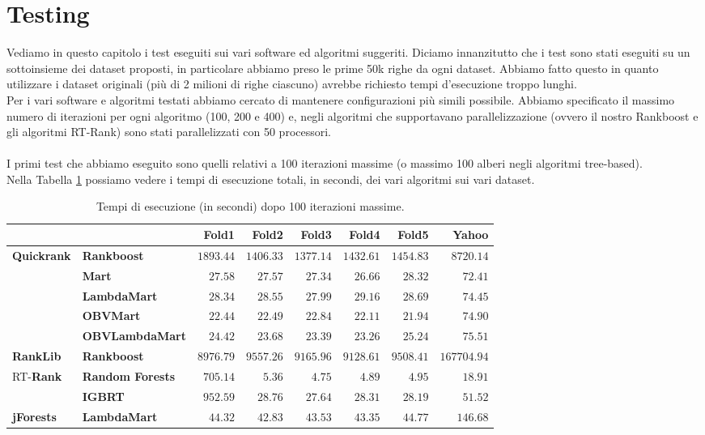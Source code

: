 \chapter*{Testing}
	Vediamo in questo capitolo i test eseguiti sui vari software ed algoritmi suggeriti. Diciamo innanzitutto che i test sono stati eseguiti su un sottoinsieme dei dataset proposti, in particolare abbiamo preso le prime 50k righe da ogni dataset. Abbiamo fatto questo in quanto utilizzare i dataset originali (più di 2 milioni di righe ciascuno) avrebbe richiesto tempi d'esecuzione troppo lunghi.\\
	Per i vari software e  algoritmi testati abbiamo cercato di mantenere configurazioni più simili possibile. Abbiamo specificato il massimo numero di iterazioni per ogni algoritmo (100, 200 e 400) e, negli algoritmi che supportavano parallelizzazione (ovvero il nostro Rankboost e gli algoritmi RT-Rank) sono stati parallelizzati con 50 processori.\\
	\\
	I primi test che abbiamo eseguito sono quelli relativi a 100 iterazioni massime (o massimo 100 alberi negli algoritmi tree-based).\\
	Nella Tabella \ref{tab:time_100} possiamo vedere i tempi di esecuzione totali, in secondi, dei vari algoritmi sui vari dataset.

	\begin{table}[!h]
		\centering
		\begin{tabular}{ll|r|r|r|r|r|r|}
			&& \textbf{Fold1} & \textbf{Fold2} & \textbf{Fold3} & \textbf{Fold4} & \textbf{Fold5} & \textbf{Yahoo}\\
			\hline
			\multirow{5}{*}{\textbf{Quickrank}} & \textbf{Rankboost} & $1893.44$ & $1406.33$ & $1377.14$ & $1432.61$ & $1454.83$ & $8720.14$\\
			\cline{2-8}
			& \textbf{Mart} & $27.58$ & $27.57$ & $27.34$ & $26.66$ & $28.32$ & $72.41$\\
			\cline{2-8}
			& \textbf{LambdaMart} & $28.34$ & $28.55$ & $27.99$ & $29.16$ & $28.69$ & $74.45$\\
			\cline{2-8}
			& \textbf{OBVMart} & $22.44$ & $22.49$ & $22.84$ & $22.11$ & $21.94$ & $74.90$\\
			\cline{2-8}
			& \textbf{OBVLambdaMart} & $24.42$ & $23.68$ & $23.39$ & $23.26$ & $25.24$ & $75.51$\\
			\hline
			\textbf{RankLib} & \textbf{Rankboost} & $8976.79$ & $9557.26$ & $9165.96$ & $9128.61$ & $9508.41$ & $167704.94$\\
			\hline
			\multirow{2}{*}{RT-\textbf{Rank}} & \textbf{Random Forests} & $705.14$ & $5.36$ & $4.75$ & $4.89$ & $4.95$ & $18.91$\\
			\cline{2-8}
			& \textbf{IGBRT} & $952.59$ & $28.76$ & $27.64$ & $28.31$ & $28.19$ & $51.52$\\
			\hline
			\textbf{jForests} & \textbf{LambdaMart} & $44.32$ & $42.83$ & $43.53$ & $43.35$ & $44.77$ & $146.68$\\
			\hline
		\end{tabular}
		\caption{Tempi di esecuzione (in secondi) dopo 100 iterazioni massime.}
		\label{tab:time_100}
	\end{table}
	
